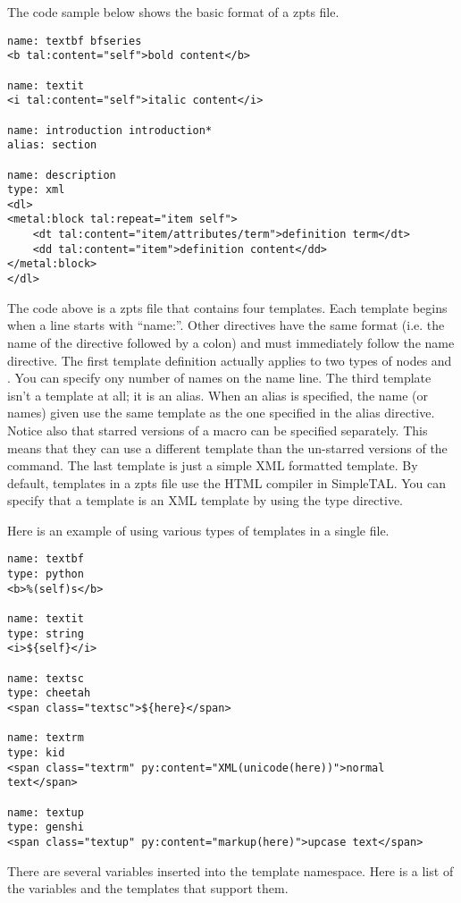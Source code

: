 The code sample below shows the basic format of a zpts file.
\begin{verbatim}
name: textbf bfseries
<b tal:content="self">bold content</b>

name: textit
<i tal:content="self">italic content</i>

name: introduction introduction*
alias: section

name: description
type: xml
<dl>
<metal:block tal:repeat="item self">
    <dt tal:content="item/attributes/term">definition term</dt>
    <dd tal:content="item">definition content</dd>
</metal:block>
</dl>
\end{verbatim}

The code above is a zpts file that contains four templates.  Each template
begins when a line starts with ``name:''.  Other directives have the same
format (i.e. the name of the directive followed by a colon) and must 
immediately follow the name directive.  The first template definition 
actually applies to two types of nodes  and .
You can specify ony number of names on the name line.  The third template
isn't a template at all; it is an alias.  When an alias is specified,
the name (or names) given use the same template as the one specified 
in the alias directive.  Notice also that starred versions of a macro
can be specified separately.  This means that they can use a different
template than the un-starred versions of the command.
The last template is just a simple XML formatted
template.  By default, templates in a zpts file use the HTML compiler
in SimpleTAL.  You can specify that a template is an XML template by using
the type directive.

Here is an example of using various types of templates in a single file.
\begin{verbatim}
name: textbf
type: python
<b>%(self)s</b>

name: textit
type: string
<i>${self}</i>

name: textsc
type: cheetah
<span class="textsc">${here}</span>

name: textrm
type: kid
<span class="textrm" py:content="XML(unicode(here))">normal text</span>

name: textup
type: genshi
<span class="textup" py:content="markup(here)">upcase text</span>
\end{verbatim}

There are several variables inserted into the template namespace.  Here is
a list of the variables and the templates that support them.

